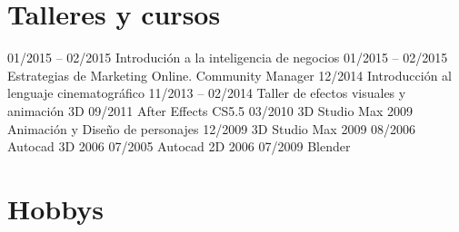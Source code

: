 \documentclass[11pt,a4paper,roman]{moderncv}
\newcommand\BackImage[2][scale=1]{%
\BgThispage
\backgroundsetup{
  contents={\texttt{[image: \#2]}}
  }
}
\begin{document}
\section{Talleres y cursos} 
 			{01/2015 -- 02/2015 Introdución a la inteligencia de negocios}
\cvline{} 					{01/2015 -- 02/2015 Estrategias de Marketing Online. Community Manager}
\cvline{} 					{12/2014 \hspace{17mm} Introducción al lenguaje cinematográfico}
	{11/2013 -- 02/2014 Taller de efectos visuales y animación 3D}
		{09/2011 \hspace{15mm} After Effects CS5.5}
\cvline{}					{03/2010 \hspace{15mm} 3D Studio Max 2009 Animación y Diseño de personajes}
\cvline{}					{12/2009 \hspace{15mm} 3D Studio Max 2009}
\cvline{}					{08/2006 \hspace{15mm} Autocad 3D 2006}
\cvline{}					{07/2005 \hspace{15mm} Autocad 2D 2006}
				{07/2009 \hspace{15mm} Blender}

\section{Hobbys}






\end{document}
